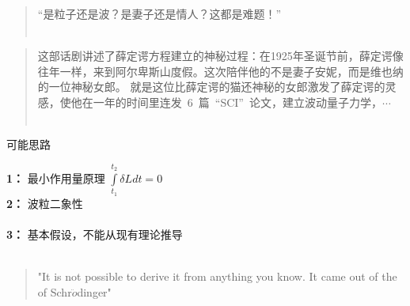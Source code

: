 \begin{frame}
    \begin{alertblock} {}  
    \begin{quote}
        “是粒子还是波？是妻子还是情人？这都是难题！” \\
        ~~\\
    \end{quote}  
    \begin{quote}    
    这部话剧讲述了薛定谔方程建立的神秘过程：在1925年圣诞节前，薛定谔像往年一样，来到阿尔卑斯山度假。这次陪伴他的不是妻子安妮，而是维也纳的一位神秘女郎。
    就是这位比薛定谔的猫还神秘的女郎激发了薛定谔的灵感，使他在一年的时间里连发~6~篇~“SCI”~论文，建立波动量子力学，$\cdots$\\
    ~~\\
    \end{quote} 
    \end{alertblock}   
\end{frame}

\begin{frame}
	\begin{alertblock} {可能思路}  
		\begin{itemize}
			\Item 	\textbf{1：}  最小作用量原理 $\int\limits_{t_1}^{t_2} \delta L d t =0 $\\ 
			\Item 	\textbf{2：}  波粒二象性\\ 
			~\\ 
			\Item 	\textbf{3：}  基本假设，不能从现有理论推导\\
            ~\\ 
            \begin{quote}
            "It is not possible to derive it from anything you know. It came out of the \alert{\faHeartbeat} of Schr$\ddot{o}$dinger"\\
            \end{quote}
		\end{itemize}
	\end{alertblock}
\end{frame}

